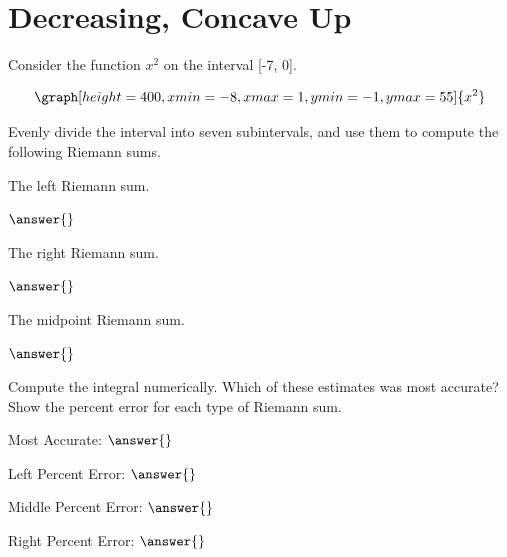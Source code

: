 \documentclass{ximera}
\begin{document}
\section{Decreasing, Concave Up}
\begin{question}
Consider the function $x^2$ on the interval [-7, 0].

\[
\graph[height=400,xmin=-8,xmax=1,ymin=-1,ymax=55]{x^2}
\]

Evenly divide the interval into seven subintervals, and use them to compute the following Riemann sums.

The left Riemann sum.

\begin{onlineOnly}
\begin{sageCell}

\end{sageCell}
\end{onlineOnly}

$\answer{}$

The right Riemann sum.

\begin{onlineOnly}
\begin{sageCell}

\end{sageCell}
\end{onlineOnly}

$\answer{}$

The midpoint Riemann sum.

\begin{onlineOnly}
\begin{sageCell}

\end{sageCell}
\end{onlineOnly}

$\answer{}$

Compute the integral numerically. Which of these estimates was most accurate? Show the percent error for each type of Riemann sum.

\begin{onlineOnly}
\begin{sageCell}

\end{sageCell}
\end{onlineOnly}

Most Accurate: $\answer{}$

Left Percent Error: $\answer{}$

Middle Percent Error: $\answer{}$

Right Percent Error: $\answer{}$
\end{question}
\end{document}
